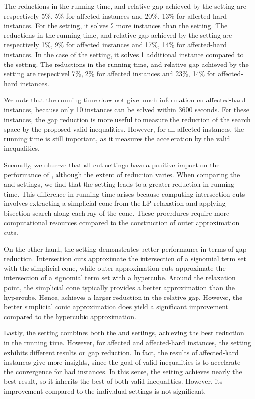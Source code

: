 The reductions in the running time, and relative gap achieved by the  \oc setting are  respectively  5\%, 5\% for affected instances and  20\%, 13\% for affected-hard instances. For the \ic setting, it solves 2 more instances than the \disable setting. The reductions in the running time, and relative gap achieved by the \ic setting are  respectively  1\%, 9\% for affected instances and 17\%, 14\% for affected-hard instances. In the case of the \oic setting, it solves 1 additional instance compared to  the \disable setting. The reductions in the running time, and relative gap achieved by the \oic setting are respectivel 7\%,  2\% for affected instances and  23\%, 14\% for affected-hard instances.

We note that the running time  does not give much information on affected-hard instances, because only 10 instances can be solved within 3600 seconds. For these instances, the gap reduction is more useful to measure the reduction of the search space by the proposed valid inequalities. However, for all affected instances, the running time  is still important, as it measures the acceleration by the valid inequalities. 

Secondly, we observe that all cut settings have a positive impact on the performance of \scip, although the extent of reduction varies. When comparing the \oc and \ic settings, we find that the \oc setting leads to a greater reduction in running time. This difference in running time arises because computing intersection cuts involves extracting a simplicial cone from the LP relaxation and applying bisection search along each ray of the cone. These procedures require more computational resources compared to the construction of outer approximation cuts.


On the other hand, the \ic setting demonstrates better performance in terms of gap reduction. Intersection cuts approximate the intersection of a signomial term set with the simplicial cone, while outer approximation cuts approximate the intersection of a signomial term set with a hypercube. Around the relaxation point, the simplicial cone typically provides a better  approximation than the hypercube. Hence, \ic achieves a larger reduction in the relative gap. However, the better simplicial conic approximation does yield a significant improvement compared to the hypercubic approximation.

Lastly, the \oic setting combines both the \oc and \ic settings, achieving the best reduction in the running time. However, for affected and affected-hard instances, the setting exhibits different results on gap reduction. In fact, the results of 
affected-hard instances give more insights, since the goal of valid inequalities is to accelerate the convergence for had instances. In this sense, the \oic setting achieves nearly the best result,  so it inherits the best of both valid inequalities.  However, its improvement compared to the individual settings is not significant.

